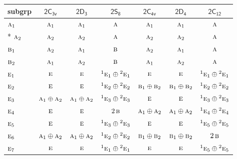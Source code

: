 \documentclass[10pt,a4paper]{article}
\numberwithin{equation}{section}
\newcommand{\grp}[1]{\mathsf{#1}}
\newcommand{\irr}[1]{\text{\normalfont\scshape #1}}
\newcommand{\conjpair}[1]{{}^{#1}}
\begin{document}
{\small\begin{longtable}{@{}lcccccc@{}}\toprule
subgrp & \href{2C3v.pdf}{$\grp{2C_{3v}}$} & \href{2D3.pdf}{$\grp{2D_{3}}$} & \href{2S8.pdf}{$\grp{2S_{8}}$} & \href{2C4v.pdf}{$\grp{2C_{4v}}$} & \href{2D4.pdf}{$\grp{2D_{4}}$} & \href{2C12.pdf}{$\grp{2C_{12}}$}\\\midrule\endhead
\bottomrule\endfoot\endlastfoot
$\irr{a}_{1}$ & $\irr{a}_{1}$ & $\irr{a}_{1}$ & $\irr{a}$ & $\irr{a}_{1}$ & $\irr{a}_{1}$ & $\irr{a}$\\*
$\irr{a}_{2}$ & $\irr{a}_{2}$ & $\irr{a}_{2}$ & $\irr{a}$ & $\irr{a}_{2}$ & $\irr{a}_{2}$ & $\irr{a}$\\
$\irr{b}_{1}$ & $\irr{a}_{2}$ & $\irr{a}_{1}$ & $\irr{b}$ & $\irr{a}_{2}$ & $\irr{a}_{1}$ & $\irr{a}$\\
$\irr{b}_{2}$ & $\irr{a}_{1}$ & $\irr{a}_{2}$ & $\irr{b}$ & $\irr{a}_{1}$ & $\irr{a}_{2}$ & $\irr{a}$\\
$\irr{e}_{1}$ & $\irr{e}$ & $\irr{e}$ & $\conjpair{1}\irr{e}_{1}\oplus \conjpair{2}\irr{e}_{1}$ & $\irr{e}$ & $\irr{e}$ & $\conjpair{1}\irr{e}_{1}\oplus \conjpair{2}\irr{e}_{1}$\\
$\irr{e}_{2}$ & $\irr{e}$ & $\irr{e}$ & $\conjpair{1}\irr{e}_{2}\oplus \conjpair{2}\irr{e}_{2}$ & $\irr{b}_{1}\oplus \irr{b}_{2}$ & $\irr{b}_{1}\oplus \irr{b}_{2}$ & $\conjpair{1}\irr{e}_{2}\oplus \conjpair{2}\irr{e}_{2}$\\
$\irr{e}_{3}$ & $\irr{a}_{1}\oplus \irr{a}_{2}$ & $\irr{a}_{1}\oplus \irr{a}_{2}$ & $\conjpair{1}\irr{e}_{3}\oplus \conjpair{2}\irr{e}_{3}$ & $\irr{e}$ & $\irr{e}$ & $\conjpair{1}\irr{e}_{3}\oplus \conjpair{2}\irr{e}_{3}$\\
$\irr{e}_{4}$ & $\irr{e}$ & $\irr{e}$ & $2\,\irr{b}$ & $\irr{a}_{1}\oplus \irr{a}_{2}$ & $\irr{a}_{1}\oplus \irr{a}_{2}$ & $\conjpair{1}\irr{e}_{4}\oplus \conjpair{2}\irr{e}_{4}$\\
$\irr{e}_{5}$ & $\irr{e}$ & $\irr{e}$ & $\conjpair{1}\irr{e}_{3}\oplus \conjpair{2}\irr{e}_{3}$ & $\irr{e}$ & $\irr{e}$ & $\conjpair{1}\irr{e}_{5}\oplus \conjpair{2}\irr{e}_{5}$\\
$\irr{e}_{6}$ & $\irr{a}_{1}\oplus \irr{a}_{2}$ & $\irr{a}_{1}\oplus \irr{a}_{2}$ & $\conjpair{1}\irr{e}_{2}\oplus \conjpair{2}\irr{e}_{2}$ & $\irr{b}_{1}\oplus \irr{b}_{2}$ & $\irr{b}_{1}\oplus \irr{b}_{2}$ & $2\,\irr{b}$\\
$\irr{e}_{7}$ & $\irr{e}$ & $\irr{e}$ & $\conjpair{1}\irr{e}_{1}\oplus \conjpair{2}\irr{e}_{1}$ & $\irr{e}$ & $\irr{e}$ & $\conjpair{1}\irr{e}_{5}\oplus \conjpair{2}\irr{e}_{5}$\\

\end{longtable}}
\end{document}
